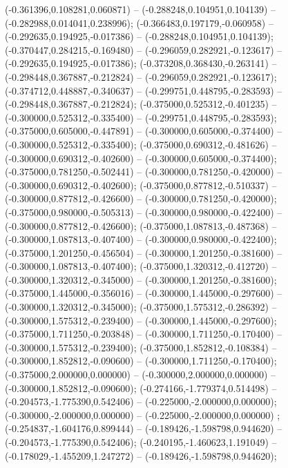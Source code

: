  (-0.361396,0.108281,0.060871) -- (-0.288248,0.104951,0.104139) -- (-0.282988,0.014041,0.238996);
 (-0.366483,0.197179,-0.060958) -- (-0.292635,0.194925,-0.017386) -- (-0.288248,0.104951,0.104139);
 (-0.370447,0.284215,-0.169480) -- (-0.296059,0.282921,-0.123617) -- (-0.292635,0.194925,-0.017386);
 (-0.373208,0.368430,-0.263141) -- (-0.298448,0.367887,-0.212824) -- (-0.296059,0.282921,-0.123617);
 (-0.374712,0.448887,-0.340637) -- (-0.299751,0.448795,-0.283593) -- (-0.298448,0.367887,-0.212824);
 (-0.375000,0.525312,-0.401235) -- (-0.300000,0.525312,-0.335400) -- (-0.299751,0.448795,-0.283593);
 (-0.375000,0.605000,-0.447891) -- (-0.300000,0.605000,-0.374400) -- (-0.300000,0.525312,-0.335400);
 (-0.375000,0.690312,-0.481626) -- (-0.300000,0.690312,-0.402600) -- (-0.300000,0.605000,-0.374400);
 (-0.375000,0.781250,-0.502441) -- (-0.300000,0.781250,-0.420000) -- (-0.300000,0.690312,-0.402600);
 (-0.375000,0.877812,-0.510337) -- (-0.300000,0.877812,-0.426600) -- (-0.300000,0.781250,-0.420000);
 (-0.375000,0.980000,-0.505313) -- (-0.300000,0.980000,-0.422400) -- (-0.300000,0.877812,-0.426600);
 (-0.375000,1.087813,-0.487368) -- (-0.300000,1.087813,-0.407400) -- (-0.300000,0.980000,-0.422400);
 (-0.375000,1.201250,-0.456504) -- (-0.300000,1.201250,-0.381600) -- (-0.300000,1.087813,-0.407400);
 (-0.375000,1.320312,-0.412720) -- (-0.300000,1.320312,-0.345000) -- (-0.300000,1.201250,-0.381600);
 (-0.375000,1.445000,-0.356016) -- (-0.300000,1.445000,-0.297600) -- (-0.300000,1.320312,-0.345000);
 (-0.375000,1.575312,-0.286392) -- (-0.300000,1.575312,-0.239400) -- (-0.300000,1.445000,-0.297600);
 (-0.375000,1.711250,-0.203848) -- (-0.300000,1.711250,-0.170400) -- (-0.300000,1.575312,-0.239400);
 (-0.375000,1.852812,-0.108384) -- (-0.300000,1.852812,-0.090600) -- (-0.300000,1.711250,-0.170400);
 (-0.375000,2.000000,0.000000) -- (-0.300000,2.000000,0.000000) -- (-0.300000,1.852812,-0.090600);
 (-0.274166,-1.779374,0.514498) -- (-0.204573,-1.775390,0.542406) -- (-0.225000,-2.000000,0.000000);
 (-0.300000,-2.000000,0.000000) -- (-0.225000,-2.000000,0.000000) ;
 (-0.254837,-1.604176,0.899444) -- (-0.189426,-1.598798,0.944620) -- (-0.204573,-1.775390,0.542406);
 (-0.240195,-1.460623,1.191049) -- (-0.178029,-1.455209,1.247272) -- (-0.189426,-1.598798,0.944620);
